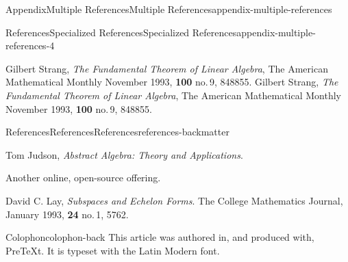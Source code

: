 \documentclass[twoside,10pt,]{article}
\numberwithin{equation}{section}
\begin{document}
\begin{appendixptx}{Appendix}{Multiple References}{}{Multiple References}{}{}{appendix-multiple-references}
\begin{references-subsection}{References}{Specialized References}{}{Specialized References}{}{}{appendix-multiple-references-4}
\begin{referencelist}
\hypertarget{biblio-strang-article-dos}{}Gilbert Strang, \textit{The Fundamental Theorem of Linear Algebra}, The American Mathematical Monthly November 1993, \textbf{100} no.\@\,9, 848\textendash{}855.
\hypertarget{biblio-strang-article-tres}{}Gilbert Strang, \textit{The Fundamental Theorem of Linear Algebra}, The American Mathematical Monthly November 1993, \textbf{100} no.\@\,9, 848\textendash{}855.
\end{referencelist}
\end{references-subsection}
\end{appendixptx}
%
%
%
\typeout{************************************************}
\typeout{************************************************}
%
\begin{references-section-numberless}{References}{References}{}{References}{}{}{references-backmatter}
\begin{referencelist}
\hypertarget{biblio-judson-AATA}{}Tom Judson, \textit{Abstract Algebra: Theory and Applications}. \par\hypertarget{note-judson-AATA}{}%
Another online, open-source offering.%

\hypertarget{biblio-lay-article}{}David C. Lay, \textit{Subspaces and Echelon Forms}. The College Mathematics Journal, January 1993, \textbf{24} no.\@\,1, 57\textendash{}62.
\end{referencelist}
\end{references-section-numberless}
\begin{backcolophon}{Colophon}{colophon-back}%
This article was authored in, and produced with, PreTeXt.  It is typeset with the Latin Modern font.%
\end{backcolophon}%
\end{document}
